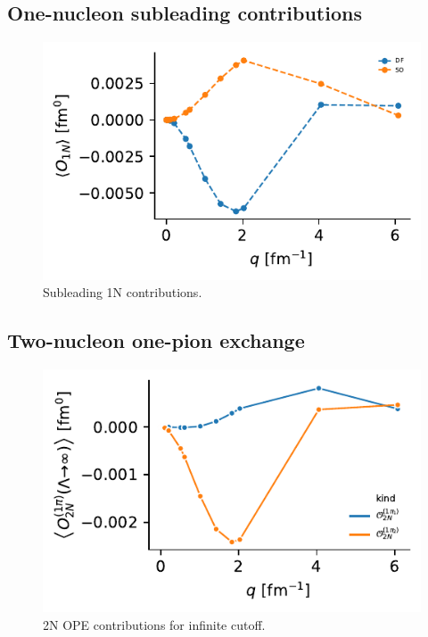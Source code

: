 \documentclass[onecolumn]{revtex4-2}
\begin{document}
\subsection{One-nucleon subleading contributions}
\begin{figure}[htb!]
    \includegraphics{figs/1n-nlo.pdf}
    \caption{Subleading 1N contributions.}
    \label{}
\end{figure}

\subsection{Two-nucleon one-pion exchange}
\begin{figure}[htb!]
    \includegraphics{figs/2n-ope.pdf}
    \caption{2N OPE contributions for infinite cutoff.}
    \label{}
\end{figure}
\end{document}

